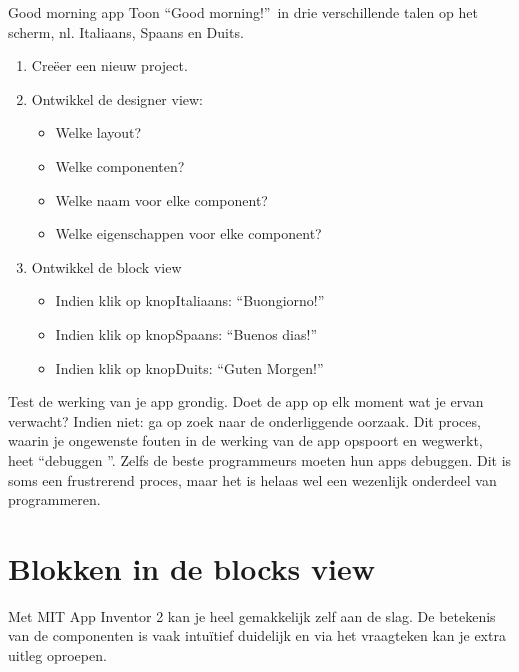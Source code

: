 \begin{opdracht}{Good morning app}
	Toon \textquotedblleft Good morning!\textquotedblright \ in drie verschillende talen op het scherm, nl. Italiaans, Spaans en Duits.
	
	\begin{minipage}{.5\linewidth}
	\end{minipage}
	\begin{minipage}{.5\linewidth}
		\begin{enumerate}
			\item Cre\"eer een nieuw project.
			\item Ontwikkel de designer view:
			\begin{itemize}
				\item Welke layout?
				\item Welke componenten?
				\item Welke naam voor elke component?
				\item Welke eigenschappen voor elke component?
			\end{itemize}
			\item Ontwikkel de block view
			\begin{itemize}
				\item Indien klik op knopItaliaans: \textquotedblleft Buongiorno!\textquotedblright
				\item Indien klik op knopSpaans: \textquotedblleft Buenos dias!\textquotedblright
				\item Indien klik op knopDuits: \textquotedblleft Guten Morgen!\textquotedblright
			\end{itemize}
		\end{enumerate}
	\end{minipage}

Test de werking van je app grondig. Doet de app op elk moment wat je ervan verwacht? Indien niet: ga op zoek naar de onderliggende oorzaak. Dit proces, waarin je ongewenste fouten in de werking van de app opspoort en wegwerkt, heet \textquotedblleft debuggen \textquotedblright. Zelfs de beste programmeurs moeten hun apps debuggen. Dit is soms een frustrerend proces, maar het is helaas wel een wezenlijk onderdeel van programmeren.

\end{opdracht}

\section{Blokken in de blocks view}
\label{sec:Mod2_Sec2}
%
Met MIT App Inventor 2 kan je heel gemakkelijk zelf aan de slag. De betekenis van de componenten is vaak intu\"itief duidelijk en via het vraagteken kan je extra uitleg oproepen. 

